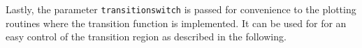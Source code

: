 Lastly, the parameter \texttt{transitionswitch} is passed for
convenience to the plotting routines where the transition function is
implemented. It can be used for for an easy control of the transition
region as described in the following.






